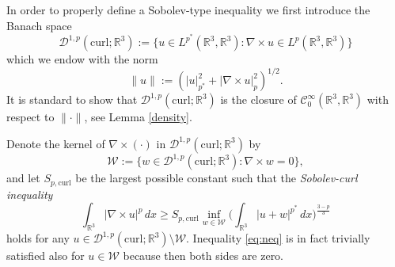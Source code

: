 \documentclass[12pt,leqno,twoside]{amsart}
\def\R{\mathbb{R}}
\def\curl{\mathrm{curl}}
\def\Wc{\mathscr{W}}
\def\W{\mathcal{W}}
\newcommand{\cC}{{\mathcal C}}
\newcommand{\cD}{{\mathcal D}}
\newcommand{\cW}{{\mathcal W}}
\def\r{\mathbb{R}}
\def\r3{\mathbb{R}^3}
\def\Wc{\cD^{1,p}(\curl;\R^3)}
\def\curlop{\nabla\times}
\numberwithin{equation}{section}
\begin{document}
 
In order to properly define a Sobolev-type inequality we first introduce the Banach space 
$$
\Wc := \big\{u\in L^{p^*}(\R^3,\R^3): \curlop u\in L^p(\R^3,\R^3)\big\}
$$
which we endow with the norm 
$$
\|u\|:= \left(|u|^2_{p^*}+|\curlop u|^2_p\right)^{1/2}.
$$
 It is standard to show that
$\Wc$ is the closure of $\cC^{\infty}_0(\R^3,\R^3)$ with respect to $\|\cdot\|$, see Lemma \ref{density}.

Denote the kernel of $\curlop (\cdot )$ in $\Wc$  by
$$\cW:=\big\{w\in \Wc: \curlop w=0\big\},$$
and let $S_{p,\curl}$ be the largest possible constant such that the {\em Sobolev-curl inequality}
\begin{equation}\label{eq:neq}
\int_{\r3}|\curlop u|^p\, dx\geq S_{p,\curl}\inf_{w\in \cW}\Big(\int_{\r3}|u+w|^{p^*}\,dx\Big)^{\frac{3-p}{3}}
\end{equation}
holds for any $u\in \Wc\setminus \W$. Inequality \eqref{eq:neq} is in fact trivially satisfied also for $u\in \cW$ because then both sides are zero. 
\end{document}
